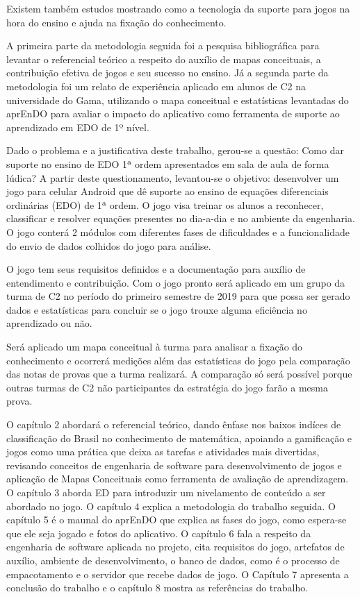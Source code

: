 Existem também estudos mostrando como a tecnologia da suporte para jogos na hora do ensino e ajuda na fixação do conhecimento. 

A primeira parte da metodologia seguida foi a pesquisa bibliográfica para levantar o referencial teórico a respeito do auxílio de mapas conceituais, a contribuição efetiva de jogos e seu sucesso no ensino. Já a segunda parte da metodologia foi um relato de experiência aplicado em alunos de C2 na universidade do Gama, utilizando o mapa conceitual e estatísticas levantadas do aprEnDO para avaliar o impacto do aplicativo como ferramenta de suporte ao aprendizado em EDO de 1º nível.


Dado o problema e a justificativa deste trabalho, gerou-se a questão: Como dar suporte no ensino de EDO 1ª ordem apresentados em sala de aula de forma lúdica? A partir deste questionamento, levantou-se o objetivo: desenvolver um jogo para celular Android que dê suporte ao ensino de equações diferenciais ordinárias (EDO) de 1ª ordem. O jogo visa treinar os alunos a reconhecer, classificar e resolver equações presentes no dia-a-dia e no ambiente da engenharia.
O jogo conterá 2 módulos com diferentes fases de dificuldades e a funcionalidade do envio de dados colhidos do jogo para análise.

O jogo tem seus requisitos definidos e a documentação para auxílio de entendimento e contribuição. Com o jogo pronto será aplicado em um grupo da turma de C2 no período do primeiro semestre de 2019 para que possa ser gerado dados e estatísticas para concluir se o jogo trouxe alguma eficiência no aprendizado ou não.

Será aplicado um mapa conceitual à turma para analisar a fixação do conhecimento e ocorrerá medições além das estatísticas do jogo pela comparação das notas de provas que a turma realizará. A comparação só será possível porque outras turmas de C2 não participantes da estratégia do jogo farão a mesma prova.

O capítulo 2 abordará o referencial teórico, dando ênfase nos baixos indíces de classificação do Brasil no conhecimento de matemática, apoiando a gamificação e jogos como uma prática que deixa as tarefas e atividades mais divertidas, revisando conceitos de engenharia de software para desenvolvimento de jogos e aplicação de Mapas Conceituais como ferramenta de avaliação de aprendizagem.
O capítulo 3 aborda ED para introduzir um nivelamento de conteúdo a ser abordado no jogo. O capítulo 4 explica a metodologia do trabalho seguida. O capítulo 5 é o maunal do aprEnDO que explica as fases do jogo, como espera-se que ele seja jogado e fotos do aplicativo. O capítulo 6 fala a respeito da engenharia de software aplicada no projeto, cita requisitos do jogo, artefatos de auxílio, ambiente de desenvolvimento, o banco de dados, como é o processo de empacotamento e o servidor que recebe dados de jogo. O Capítulo 7 apresenta a conclusão do trabalho e o capítulo 8 mostra as referências do trabalho.
